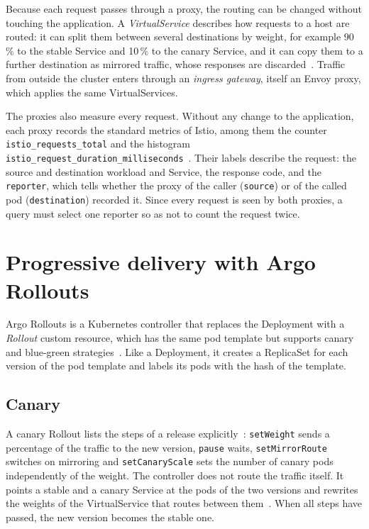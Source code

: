 Because each request passes through a proxy, the routing can be changed without touching the application. A \emph{VirtualService} describes how requests to a host are routed: it can split them between several destinations by weight, for example 90\,\% to the stable Service and 10\,\% to the canary Service, and it can copy them to a further destination as mirrored traffic, whose responses are discarded~\cite{IstioVirtualService}. Traffic from outside the cluster enters through an \emph{ingress gateway}, itself an Envoy proxy, which applies the same VirtualServices.

The proxies also measure every request. Without any change to the application, each proxy records the standard metrics of Istio, among them the counter \texttt{istio\_requests\_total} and the histogram \texttt{istio\_request\_duration\_milliseconds}~\cite{IstioMetrics}. Their labels describe the request: the source and destination workload and Service, the response code, and the \texttt{reporter}, which tells whether the proxy of the caller (\texttt{source}) or of the called pod (\texttt{destination}) recorded it. Since every request is seen by both proxies, a query must select one reporter so as not to count the request twice.

\section{Progressive delivery with Argo Rollouts}
\label{sec:ArgoRollouts}
Argo Rollouts is a Kubernetes controller that replaces the Deployment with a \emph{Rollout} custom resource, which has the same pod template but supports canary and blue-green strategies~\cite{ArgoRollouts}. Like a Deployment, it creates a ReplicaSet for each version of the pod template and labels its pods with the hash of the template.

\subsection{Canary}
\label{sec:ArgoRolloutsCanary}
A canary Rollout lists the steps of a release explicitly~\cite{ArgoRolloutsCanary}: \texttt{setWeight} sends a percentage of the traffic to the new version, \texttt{pause} waits, \texttt{setMirrorRoute} switches on mirroring and \texttt{setCanaryScale} sets the number of canary pods independently of the weight. The controller does not route the traffic itself. It points a stable and a canary Service at the pods of the two versions and rewrites the weights of the VirtualService that routes between them~\cite{ArgoRolloutsIstio}. When all steps have passed, the new version becomes the stable one.

